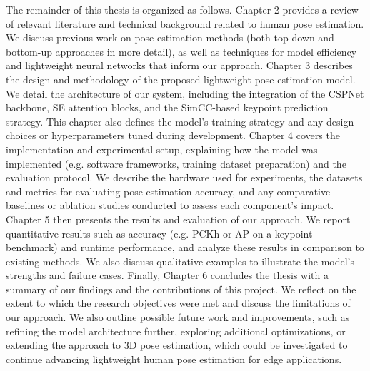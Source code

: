 The remainder of this thesis is organized as follows. Chapter 2 provides a review of relevant literature and technical background related to human pose estimation. We discuss previous work on pose estimation methods (both top-down and bottom-up approaches in more detail), as well as techniques for model efficiency and lightweight neural networks that inform our approach. Chapter 3 describes the design and methodology of the proposed lightweight pose estimation model. We detail the architecture of our system, including the integration of the CSPNet backbone, SE attention blocks, and the SimCC-based keypoint prediction strategy. This chapter also defines the model’s training strategy and any design choices or hyperparameters tuned during development. Chapter 4 covers the implementation and experimental setup, explaining how the model was implemented (e.g. software frameworks, training dataset preparation) and the evaluation protocol. We describe the hardware used for experiments, the datasets and metrics for evaluating pose estimation accuracy, and any comparative baselines or ablation studies conducted to assess each component’s impact. Chapter 5 then presents the results and evaluation of our approach. We report quantitative results such as accuracy (e.g. PCKh or AP on a keypoint benchmark) and runtime performance, and analyze these results in comparison to existing methods. We also discuss qualitative examples to illustrate the model’s strengths and failure cases. Finally, Chapter 6 concludes the thesis with a summary of our findings and the contributions of this project. We reflect on the extent to which the research objectives were met and discuss the limitations of our approach. We also outline possible future work and improvements, such as refining the model architecture further, exploring additional optimizations, or extending the approach to 3D pose estimation, which could be investigated to continue advancing lightweight human pose estimation for edge applications.